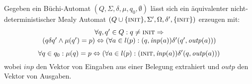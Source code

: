 Gegeben ein Büchi-Automat $(Q,\Sigma,\delta,\mu,q_0,\emptyset)$ lässt sich ein äquivalenter nicht-deterministischer Mealy Automat $(Q\cup\{\textnormal{\scshape init}\},\Sigma',\Omega,\delta',\{\textnormal{\scshape init}\})$ erzeugen mit:
\[
\begin{array}{c}
  \forall q,q'\in Q: q\neq \const{init}\Rightarrow\\
  (q\delta q'\land \mu(q') = p) \Leftrightarrow (\forall a\in l(p): (q,\mathit{inp}(a))\delta'(q',\mathit{outp}(a)))
\end{array}
\]
\[
\forall q\in q_0: \mu(q) = p \Leftrightarrow (\forall a\in l(p): (\const{init},\mathit{inp}(a))\delta'(q,\mathit{outp}(a)))
\]
wobei $\mathit{inp}$ den Vektor von Eingaben aus einer Belegung extrahiert und $\mathit{outp}$ den Vektor von Ausgaben.